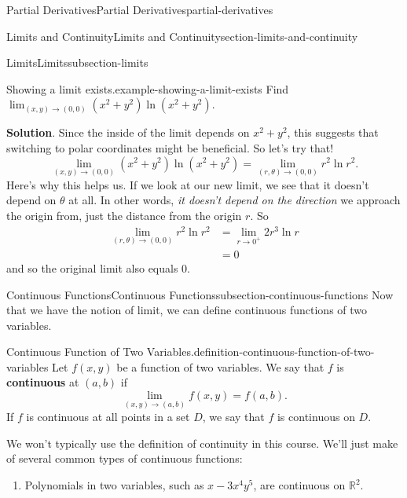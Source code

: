 \documentclass[oneside,10pt,]{book}
\newcommand{\terminology}[1]{\textbf{#1}}
\numberwithin{equation}{section}
\newcommand{\RR}{\mathbb{R}}
\begin{document}
\begin{chapterptx}{Partial Derivatives}{}{Partial Derivatives}{}{}{partial-derivatives}
\begin{sectionptx}{Limits and Continuity}{}{Limits and Continuity}{}{}{section-limits-and-continuity}
\begin{subsectionptx}{Limits}{}{Limits}{}{}{subsection-limits}
\begin{example}{Showing a limit exists.}{example-showing-a-limit-exists}
\hypertarget{p-1348}{}%
Find \(\lim_{(x,y)\to(0,0)}(x^{2}+y^{2})\ln(x^{2}+y^{2})\).%
\par\smallskip%
\noindent\textbf{Solution}.\hypertarget{solution-215}{}\quad%
\hypertarget{p-1349}{}%
Since the inside of the limit depends on \(x^{2}+y^{2}\), this suggests that switching to polar coordinates might be beneficial. So let's try that!%
\begin{equation*}
\lim_{(x,y)\to(0,0)}(x^{2}+y^{2})\ln(x^{2}+y^{2}) = \lim_{(r,\theta)\to(0,0)}r^{2}\ln r^{2}.
\end{equation*}
Here's why this helps us. If we look at our new limit, we see that it doesn't depend on \(\theta\) at all. In other words, \emph{it doesn't depend on the direction} we approach the origin from, just the distance from the origin \(r\). So%
\begin{align*}
\lim_{(r,\theta)\to(0,0)}r^{2}\ln r^{2} & = \lim_{r\to0^{+}} 2r^{3}\ln r \\
& = 0 
\end{align*}
and so the original limit also equals \(0\).%
\end{example}
\end{subsectionptx}
%
%
\typeout{************************************************}
\typeout{************************************************}
%
\begin{subsectionptx}{Continuous Functions}{}{Continuous Functions}{}{}{subsection-continuous-functions}
\hypertarget{p-1350}{}%
Now that we have the notion of limit, we can define continuous functions of two variables.%
\begin{definition}{Continuous Function of Two Variables.}{definition-continuous-function-of-two-variables}%
\hypertarget{p-1351}{}%
Let \(f(x,y)\) be a function of two variables. We say that \(f\) is \terminology{continuous} at \((a,b)\) if%
\begin{equation*}
\lim_{(x,y)\to(a,b)}f(x,y) = f(a,b).
\end{equation*}
If \(f\) is continuous at all points in a set \(D\), we say that \(f\) is continuous on \(D\).%
\end{definition}
\hypertarget{p-1352}{}%
We won't typically use the definition of continuity in this course. We'll just make of several common types of continuous functions:%
\leavevmode%
\begin{enumerate}
\item\hypertarget{li-134}{}Polynomials in two variables, such as \(x-3x^{4}y^{5}\), are continuous on \(\RR^{2}\).%

\end{enumerate}
\end{subsectionptx}
\end{sectionptx}
\end{chapterptx}
\end{document}
